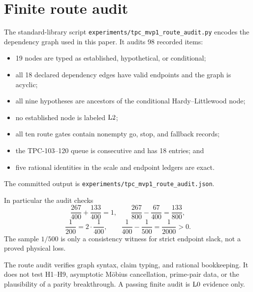 \section{Finite route audit}
\label{sec:route-audit}

The standard-library script
\texttt{experiments/tpc\_mvp1\_route\_audit.py} encodes the dependency
graph used in this paper.  It audits 98 recorded items:
\begin{itemize}[leftmargin=2em]
\item 19 nodes are typed as established, hypothetical, or
  conditional;
\item all 18 declared dependency edges have valid endpoints and the
  graph is acyclic;
\item all nine hypotheses are ancestors of the conditional
  Hardy--Littlewood node;
\item no established node is labeled \(\mathrm{L2}\);
\item all ten route gates contain nonempty go, stop, and fallback
  records;
\item the TPC-103--120 queue is consecutive and has 18 entries; and
\item five rational identities in the scale and endpoint ledgers are
  exact.
\end{itemize}
The committed output is
\texttt{experiments/tpc\_mvp1\_route\_audit.json}.

In particular the audit checks
\[
\frac{267}{400}+\frac{133}{400}=1,
\qquad
\frac{267}{800}-\frac{67}{400}=\frac{133}{800},
\]
\[
\frac1{200}=2\cdot\frac1{400},
\qquad
\frac1{400}-\frac1{500}=\frac1{2000}>0.
\]
The sample \(1/500\) is only a consistency witness for strict endpoint
slack, not a proved physical loss.

\begin{remark}
The route audit verifies graph syntax, claim typing, and rational
bookkeeping.  It does not test H1--H9, asymptotic M\"obius
cancellation, prime-pair data, or the plausibility of a parity
breakthrough.  A passing finite audit is \(\mathrm{L0}\) evidence only.
\end{remark}
